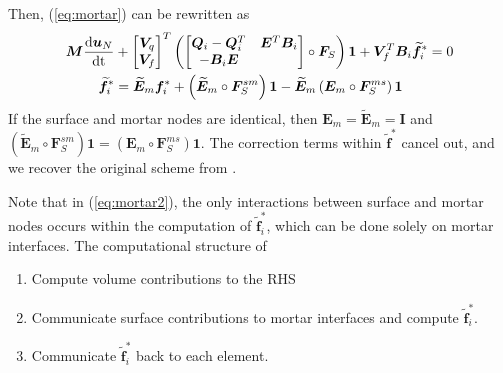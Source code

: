 \documentclass[review]{siamart0216}
\renewcommand{\tilde}{\widetilde}
\newcommand{\td}[2]{\frac{{\rm d}#1}{{\rm d}{\rm #2}}}
\newcommand{\LRp}[1]{\left( #1 \right)}
\begin{document}
Then, (\ref{eq:mortar}) can be rewritten as 
\begin{align}
\bm{M}\td{\bm{u}_N}{t} &+ 
\begin{bmatrix} \bm{V}_q \\ \bm{V}_f \end{bmatrix}^T
\LRp{\begin{bmatrix}
\bm{Q}_i-\bm{Q}_i^T & \bm{E}^T\bm{B}_i\\
-\bm{B}_i\bm{E} & \\
\end{bmatrix} \circ \bm{F}_S}\bm{1} + \bm{V}_f^T\bm{B}_i \tilde{\bm{f}}^*_i = 0 \label{eq:mortar2}\\
\tilde{\bm{f}}^*_i &= \tilde{\bm{E}}_m\bm{f}^*_i + \LRp{\tilde{\bm{E}}_m\circ \bm{F}_S^{sm}}\bm{1} - \tilde{\bm{E}}_m \LRp{ \bm{E}_m \circ \bm{F}_S^{ms}}\bm{1} 
\nonumber
\end{align}
If the surface and mortar nodes are identical, then $\bm{E}_m = \tilde{\bm{E}}_m = \bm{I}$ and $\LRp{\tilde{\bm{E}}_m \circ \bm{F}_S^{sm}}\bm{1} = \LRp{ \bm{E}_m \circ \bm{F}_S^{ms}}\bm{1}$.  The correction terms within $\tilde{\bm{f}}^*$ cancel out, and we recover the original scheme from \cite{chan2017discretely}.

Note that in (\ref{eq:mortar2}), the only interactions between surface and mortar nodes occurs within the computation of $\tilde{\bm{f}}^*_i$, which can be done solely on mortar interfaces.  The computational structure of 
\begin{enumerate}
\item Compute volume contributions to the RHS
\item Communicate surface contributions to mortar interfaces and compute $\tilde{\bm{f}}^*_i$.
\item Communicate $\tilde{\bm{f}}^*_i$ back to each element.  
\end{enumerate}
\end{document}
